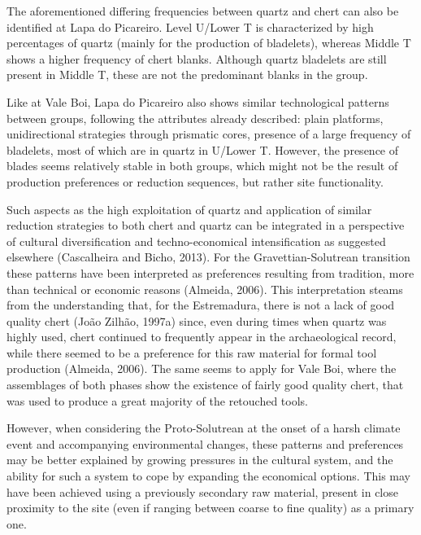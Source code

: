 \documentclass[12pt,twoside]{reedthesis}
\begin{document}
The aforementioned differing frequencies between quartz and chert can also be identified at Lapa do Picareiro. Level U/Lower T is characterized by high percentages of quartz (mainly for the production of bladelets), whereas Middle T shows a higher frequency of chert blanks. Although quartz bladelets are still present in Middle T, these are not the predominant blanks in the group.

Like at Vale Boi, Lapa do Picareiro also shows similar technological patterns between groups, following the attributes already described: plain platforms, unidirectional strategies through prismatic cores, presence of a large frequency of bladelets, most of which are in quartz in U/Lower T. However, the presence of blades seems relatively stable in both groups, which might not be the result of production preferences or reduction sequences, but rather site functionality.

Such aspects as the high exploitation of quartz and application of similar reduction strategies to both chert and quartz can be integrated in a perspective of cultural diversification and techno-economical intensification as suggested elsewhere (Cascalheira and Bicho, 2013). For the Gravettian-Solutrean transition these patterns have been interpreted as preferences resulting from tradition, more than technical or economic reasons (Almeida, 2006). This interpretation steams from the understanding that, for the Estremadura, there is not a lack of good quality chert (João Zilhão, 1997a) since, even during times when quartz was highly used, chert continued to frequently appear in the archaeological record, while there seemed to be a preference for this raw material for formal tool production (Almeida, 2006). The same seems to apply for Vale Boi, where the assemblages of both phases show the existence of fairly good quality chert, that was used to produce a great majority of the retouched tools.

However, when considering the Proto-Solutrean at the onset of a harsh climate event and accompanying environmental changes, these patterns and preferences may be better explained by growing pressures in the cultural system, and the ability for such a system to cope by expanding the economical options. This may have been achieved using a previously secondary raw material, present in close proximity to the site (even if ranging between coarse to fine quality) as a primary one.
\end{document}
